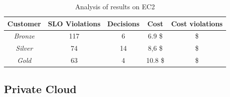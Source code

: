 


\begin{table}\label{summaryEC2}
  {\scriptsize 
\begin{center}
    \begin{tabular}{  | c | c | c | c | c |}
    \hline
         \textbf{Customer}  & \textbf{SLO Violations} & \textbf{Decisions}  & \textbf{Cost}  & \textbf{Cost violations} \\ \hline
   \textit{Bronze}   &  117 &  6 &  6.9 \$ &  \$ \\ \hline   
   \textit{Silver}  &  74 &  14 &  8,6 \$ &   \$ \\ \hline   
\textit{Gold} &   63  &  4 &  10.8 \$ &  \$ \\ \hline   

 \end{tabular}
\end{center}
\vspace{-5mm}
\caption{Analysis of results on EC2}
\label{summaryEC2}
}
\end{table}






\subsection{Private Cloud}

